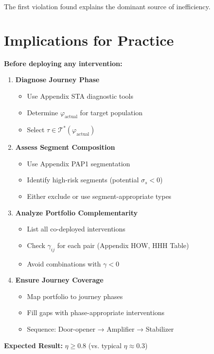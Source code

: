 The first violation found explains the dominant source of inefficiency.


\section{Implications for Practice}
\label{sec:eih-practice}

\begin{tcolorbox}[colback=blue!5!white, colframe=blue!75!black,
    title=The EIH Design Protocol]

\textbf{Before deploying any intervention:}

\begin{enumerate}
\item \textbf{Diagnose Journey Phase}
\begin{itemize}[nosep]
\item Use Appendix STA diagnostic tools
\item Determine $\varphi_{\text{actual}}$ for target population
\item Select $\tau \in \mathcal{T}^*(\varphi_{\text{actual}})$
\end{itemize}

\item \textbf{Assess Segment Composition}
\begin{itemize}[nosep]
\item Use Appendix PAP1 segmentation
\item Identify high-risk segments (potential $\sigma_s < 0$)
\item Either exclude or use segment-appropriate types
\end{itemize}

\item \textbf{Analyze Portfolio Complementarity}
\begin{itemize}[nosep]
\item List all co-deployed interventions
\item Check $\gamma_{ij}$ for each pair (Appendix HOW, HHH Table)
\item Avoid combinations with $\gamma < 0$
\end{itemize}

\item \textbf{Ensure Journey Coverage}
\begin{itemize}[nosep]
\item Map portfolio to journey phases
\item Fill gaps with phase-appropriate interventions
\item Sequence: Door-opener → Amplifier → Stabilizer
\end{itemize}
\end{enumerate}

\textbf{Expected Result:} $\eta \geq 0.8$ (vs. typical $\eta \approx 0.3$)
\end{tcolorbox}


